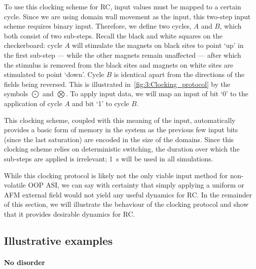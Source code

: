 To use this clocking scheme for RC, input values must be mapped to a certain cycle.
Since we are using domain wall movement as the input, this two-step input scheme requires binary input.
Therefore, we define two cycles, $A$ and $B$, which both consist of two sub-steps.
Recall the black and white squares on the checkerboard: cycle $A$ will stimulate the magnets on black sites to point `up' in the first sub-step --- while the other magnets remain unaffected --- after which the stimulus is removed from the black sites and magnets on white sites are stimulated to point `down'.
Cycle $B$ is identical apart from the directions of the fields being reversed.
This is illustrated in~\cref{fig:3:Clocking_protocol} by the symbols $\bigodot$ and $\bigotimes$.
To apply input data, we will map an input of bit `0' to the application of cycle $A$ and bit `1' to cycle $B$. \par
This clocking scheme, coupled with this meaning of the input, automatically provides a basic form of memory in the system as the previous few input bits (since the last saturation) are encoded in the size of the domains.
Since this clocking scheme relies on deterministic switching, the duration over which the sub-steps are applied is irrelevant; \qty{1}{\second} will be used in all simulations.

While this clocking protocol is likely not the only viable input method for non-volatile OOP ASI, we can say with certainty that simply applying a uniform or AFM external field would not yield any useful dynamics for RC.
In the remainder of this section, we will illustrate the behaviour of the clocking protocol and show that it provides desirable dynamics for RC.

\subsection{Illustrative examples}
\paragraph{No disorder}


